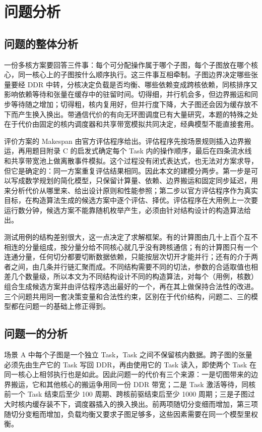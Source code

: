 \section{问题分析}

\subsection{问题的整体分析}

一份多核方案要回答三件事：每个可分配操作属于哪个子图，每个子图放在哪个核心，同一核心上的子图按什么顺序执行。这三件事互相牵制。子图边界决定哪些张量要经 DDR 中转，分核决定负载是否均衡、哪些依赖变成跨核依赖，同核排序又影响依赖等待和张量在缓存中的驻留时间。切得细，并行机会多，但边界搬运和同步等待随之增加；切得粗，核内复用好，但并行度下降，大子图还会因为缓存放不下而产生换入换出。带通信代价的有向无环图调度已有大量研究\cite{kwok1999static}，本题的特殊之处在于代价由固定的核内调度器和共享带宽模拟共同决定，经典模型不能直接套用。

评价方案的 Makespan 由官方评估程序给出。评估程序先按场景规则插入边界搬运，再用题目附录 C 的启发式确定每个 Task 内的操作顺序，最后在四条流水线和共享带宽池上做离散事件模拟。这个过程没有闭式表达式，也无法对方案求导，但它是确定的：同一方案重复评估结果相同。因此本文的建模分两步。第一步是可以写成数学规划的简化模型，只保留计算量、依赖、边界搬运和固定同步延迟，用来分析代价从哪里来、给出设计原则和性能参照；第二步以官方评估程序作为真实目标，在构造算法生成的候选方案中逐个评估、择优。评估程序在大用例上一次要运行数分钟，候选方案不能靠随机枚举产生，必须由针对结构设计的构造算法给出。

测试用例的结构差别很大，这一点决定了求解框架。有的计算图由几十上百个互不相连的分量组成，按分量分给不同核心就几乎没有跨核通信；有的计算图只有一个连通分量，任何切分都要切断数据依赖，只能按层次切开才能并行；还有的介于两者之间，由几条并行链汇聚而成。不同结构需要不同的切法，参数的合适取值也相差几个数量级，所以本文为不同结构设计不同的构造算法，对每个（用例，核数）组合生成候选方案并由评估程序选出最好的一个，再在其上做保持合法性的改进。三个问题共用同一套决策变量和合法性约束，区别在于代价结构，问题二、三的模型都在问题一的基础上修正得到。

\subsection{问题一的分析}

场景 A 中每个子图是一个独立 Task，Task 之间不保留核内数据。跨子图的张量必须先由生产它的 Task 写回 DDR，再由使用它的 Task 读入，即使两个 Task 在同一核心上相邻执行也是如此。因此问题一的代价有三个来源：一是切图带来的边界搬运，它和其他核心的搬运争用同一份 DDR 带宽；二是 Task 激活等待，同核前一个 Task 结束后至少 100 周期、跨核前驱结束后至少 1000 周期；三是子图过大时核内缓存装不下，调度器插入的换入换出。前两项随切分变细而增加，第三项随切分变粗而增加，负载均衡又要求子图足够多，这些因素需要在同一个模型里权衡。

